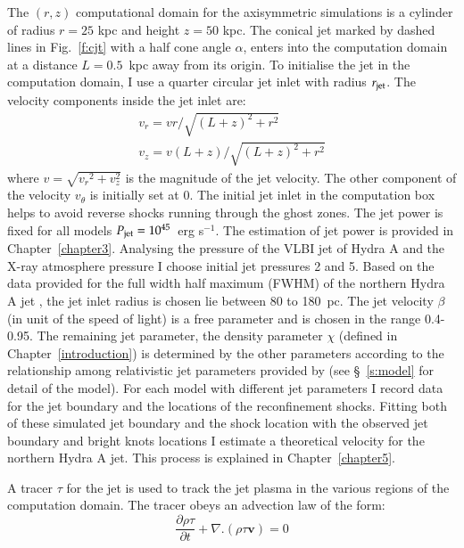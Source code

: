 The $(r, z)$ computational domain for the axisymmetric simulations is a cylinder of radius $r=25$ kpc and height $z=50$ kpc. The conical jet marked by dashed lines in Fig.~\ref{f:cjt} with a half cone angle $\alpha$, enters into the computation domain at a distance $L=0.5$~kpc away from its origin. To initialise the jet in the computation domain, I use a quarter circular jet inlet with radius $r_{\rm jet}$. The velocity components inside the jet inlet are:
\begin{eqnarray}
v_r = vr/\sqrt{(L+z)^2+r^2} \\
v_z = v(L+z)/\sqrt{(L+z)^2+r^2}
\end{eqnarray} 
where $v=\sqrt{{v_r}^2+v_z^2}$ is the magnitude of the jet velocity. The other component of the velocity $v_\theta$ is initially set at 0. The initial jet inlet in the computation box helps to avoid reverse shocks running through the ghost zones. 
The jet power is fixed for all models $P_{\rm jet} = 10^{45} $~erg s$^{-1}$. The estimation of jet power is provided in Chapter~\ref{chapter3}. Analysing the pressure of the VLBI jet of Hydra A \citep{taylor96} and the X-ray atmosphere pressure \citep{david01} I choose initial jet pressures 2 and 5. Based on the data provided for the full width half maximum (FWHM) of the northern Hydra A jet \citep{taylor90}, the jet inlet radius is chosen lie between 80 to 180~pc. The jet velocity $\beta$ (in unit of the speed of light) is a free parameter and is chosen in the range 0.4-0.95. The remaining jet parameter, the density parameter $\chi$ (defined in Chapter~\ref{introduction}) is determined by the other parameters according to the relationship among relativistic jet parameters provided by \citep{sutherland07} (see \S~\ref{s:model} for detail of the model). For each model with different jet parameters I record data for the jet boundary and the locations of the reconfinement shocks. Fitting both of these simulated jet boundary and the shock location with the observed jet boundary and bright knots locations I estimate a theoretical velocity for the northern Hydra A jet. This process is explained in Chapter~\ref{chapter5}.

A tracer $\tau$ for the jet is used to track the jet plasma in the various regions of the computation domain. The tracer obeys an advection law of the form: 
\begin{equation}
\frac{\partial \rho \tau}{\partial t}+ \nabla . (\rho \tau \textbf{v}) = 0
\end{equation}


